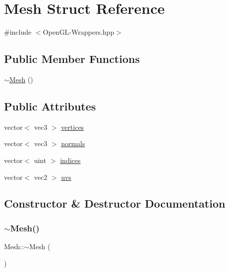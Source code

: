 \hypertarget{structMesh}{}\section{Mesh Struct Reference}
\label{structMesh}


{\ttfamily \#include $<$Open\+G\+L-\/\+Wrappers.\+hpp$>$}

\subsection*{Public Member Functions}
\begin{DoxyCompactItemize}
\item 
\mbox{\hyperlink{structMesh_a5efe4da1a4c0971cfb037bd70304c303}{$\sim$\+Mesh}} ()
\end{DoxyCompactItemize}
\subsection*{Public Attributes}
\begin{DoxyCompactItemize}
\item 
vector$<$ vec3 $>$ \mbox{\hyperlink{structMesh_adcb6c07f7b25f91163901b6ac08aefe6}{vertices}}
\item 
vector$<$ vec3 $>$ \mbox{\hyperlink{structMesh_a7f23733d1225e7c875f21b74699d0220}{normals}}
\item 
vector$<$ uint $>$ \mbox{\hyperlink{structMesh_a1bf53bf594529c21e428a0f8d93976bf}{indices}}
\item 
vector$<$ vec2 $>$ \mbox{\hyperlink{structMesh_a3819d7dd33b2b3d32f20bbaafe063fd0}{uvs}}
\end{DoxyCompactItemize}


\subsection{Constructor \& Destructor Documentation}
\mbox{\label{structMesh_a5efe4da1a4c0971cfb037bd70304c303}} 
\subsubsection{\texorpdfstring{$\sim$\+Mesh()}{~Mesh()}}
{\footnotesize\ttfamily Mesh\+::$\sim$\+Mesh (\begin{DoxyParamCaption}{ }\end{DoxyParamCaption})}



